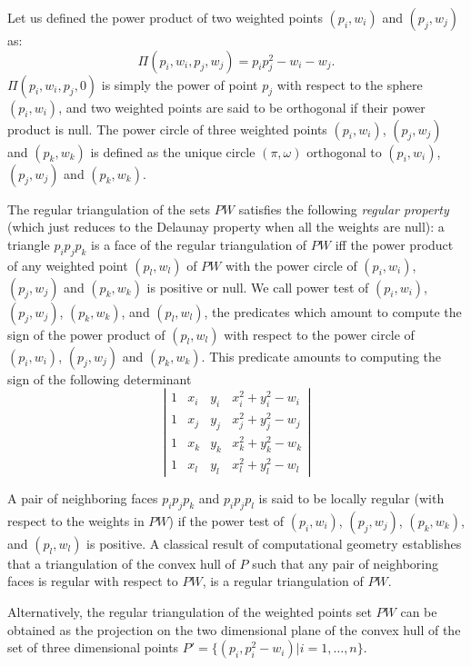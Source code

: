 Let us defined the power product of two weighted points
$(p_i, w_i)$ and $(p_j, w_j)$ as:
\[\Pi(p_i, w_i, p_j, w_j) = p_ip_j ^2 - w_i  - w_j  .\]
$\Pi(p_i, w_i, p_j, 0)$ is simply the power of point $p_j$
with respect to the sphere $(p_i, w_i)$, and two weighted points 
are said to be orthogonal if their power product is null.
The power circle of three weighted points
 $(p_i, w_i)$, $(p_j, w_j)$
and $(p_k, w_k)$ is defined as the unique circle
$(\pi, \omega)$  orthogonal to
 $(p_i, w_i)$, $(p_j, w_j)$
and $(p_k, w_k)$.

The regular triangulation of the sets ${  PW}$
satisfies the following {\em regular property} (which just reduces to the 
Delaunay property when all the weights are null):
a triangle $p_ip_jp_k$ is a face of the regular triangulation
of ${  PW}$ iff the power product of any weighted point
 $(p_l, w_l)$ of ${  PW}$ with the power circle of
 $(p_i, w_i)$, $(p_j, w_j)$ and $(p_k, w_k)$ is positive or null.
We call  power test of  $(p_i, w_i)$, $(p_j, w_j)$, $(p_k, w_k)$,
and $(p_l, w_l)$,  the predicates which amount to compute
the sign of 
the power product of $(p_l, w_l)$ with respect to
the power circle of
 $(p_i, w_i)$, $(p_j, w_j)$ and $(p_k, w_k)$.
This predicate amounts to computing the sign of
the following
determinant
\[\left| \begin{array}{cccc}
1  &  x_i  &  y_i  &  x_i ^2 + y_i ^2 - w_i  \\
1  &  x_j  &  y_j  &  x_j ^2 + y_j ^2 - w_j  \\
1  &  x_k  &  y_k  &  x_k ^2 + y_k ^2 - w_k  \\
1  &  x_l  &  y_l  &  x_l ^2 + y_l ^2 - w_l
\end{array}
\right|
\]

A pair of neighboring faces $p_ip_jp_k$
and $p_ip_jp_l$ is said to be locally regular
(with respect to  the weights in ${  PW}$)
if the power test of $(p_i, w_i)$, $(p_j, w_j)$, $(p_k, w_k)$,
and $(p_l, w_l)$ is positive.
A classical  result of computational geometry
establishes that a triangulation of the convex hull of ${  P}$
such that any pair of neighboring faces is regular with respect
to ${  PW}$, is a
 regular triangulation of ${  PW}$.

Alternatively, the regular triangulation
of the weighted points set ${  PW}$
can be obtained as the projection
on the two dimensional plane of the convex hull of the set of three
dimensional points 
${  P'}= \{ (p_i,p_i ^2 - w_i ) | i = 1, \ldots , n \}$.

